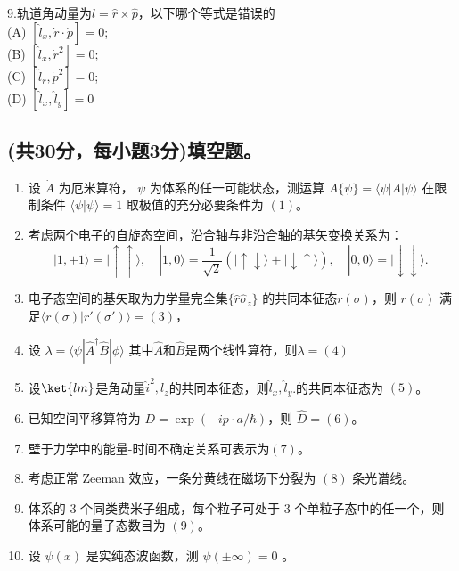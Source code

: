 9.轨道角动量为$\hat{l}=\hat{r}\times \hat{p}$，以下哪个等式是错误的\\
   (A) $[\hat{l}_x, \dot{r} \cdot \dot{p}] = 0$; \\
   (B) $[\hat{l}_x, \dot{r}^2] = 0$; \\
   (C) $[\hat{l}_r, \dot{p}^2] = 0$; \\
   (D) $[\hat{l}_x, \hat{l}_y] = 0$\\

\subsection{(共30分，每小题3分)填空题。}
\begin{enumerate}
    \item 设 $\dot{A}$ 为厄米算符， $\psi$ 为体系的任一可能状态，测运算 $A \{\psi\} = \langle \psi | A | \psi \rangle $ 在限制条件 $\langle \psi | \psi \rangle = 1$ 取极值的充分必要条件为 $(1)$。
    
    \item 考虑两个电子的自旋态空间，沿合轴与非沿合轴的基矢变换关系为：
    \[
    |1, +1\rangle = |\uparrow\uparrow\rangle, \quad |1, 0\rangle = \frac{1}{\sqrt{2}}(|\uparrow\downarrow\rangle + |\downarrow\uparrow\rangle), \quad |0, 0\rangle = |\downarrow\downarrow\rangle.~
    \]
    
    \item 电子态空间的基矢取为力学量完全集$\{\hat{r}\hat{\sigma}_z\}$ 的共同本征态$r(\sigma)$，则 $r(\sigma)$ 满足$\langle r(\sigma) | r'(\sigma') \rangle =(3)$，
 
    \item 设 $\lambda=\langle \psi |\hat{A}^\dagger \hat{B} | \phi \rangle$ 其中$\hat{A}$和$\hat{B}$是两个线性算符，则$\lambda =(4)$
    
    \item 设$\ket{lm}$是角动量{$\hat{i}^2,l_z$}的共同本征态，则{$\hat{l}_x,\hat{l}_y$}.的共同本征态为 $(5)$。
    
    \item 已知空间平移算符为 $D = \exp(-ip \cdot a/\hbar)$，则 $\hat D = (6)$。
    
    \item 壁于力学中的能量-时间不确定关系可表示为$(7)$。
    
    \item 考虑正常 Zeeman 效应，一条分黄线在磁场下分裂为 $(8)$ 条光谱线。
    
    \item 体系的 3 个同类费米子组成，每个粒子可处于 3 个单粒子态中的任一个，则体系可能的量子态数目为 $(9)$。
    
    \item 设 $\psi(x)$ 是实纯态波函数，测 $\psi(\pm\infty) = 0$ 。
\end{enumerate}

